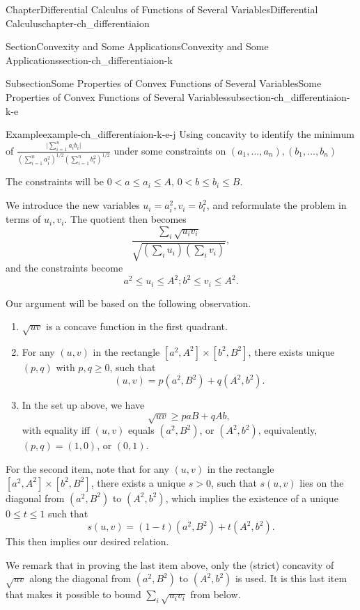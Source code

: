 \documentclass[oneside,10pt,]{book}
\numberwithin{equation}{section}
\newcommand{\lt}{<}
\begin{document}
\begin{chapterptx}{Chapter}{Differential Calculus of Functions of Several Variables}{}{Differential Calculus}{}{}{chapter-ch_differentiaion}
\begin{sectionptx}{Section}{Convexity and Some Applications}{}{Convexity and Some Applications}{}{}{section-ch_differentiaion-k}
\begin{subsectionptx}{Subsection}{Some Properties of Convex Functions of Several Variables}{}{Some Properties of Convex Functions of Several Variables}{}{}{subsection-ch_differentiaion-k-e}
\begin{example}{Example}{}{example-ch_differentiaion-k-e-j}
Using concavity to identify the minimum of \(\frac{ \Big| \sum_{i=1}^{n}a_{i}b_{i}\Big|}{\left(\sum_{i=1}^{n}a_{i}^{2}\right)^{1/2}
\left(\sum_{i=1}^{n}b_{i}^{2}\right)^{1/2}}\) under some constraints on \((a_{1},\ldots, a_{n}), (b_{1},\ldots, b_{n})\)%
\par
The constraints will be \(0\lt a\le a_{i}\le A\), \(0 \lt b\le b_{i}\le B\).%
\par
We introduce the new variables \(u_{i}=a_{i}^{2}, v_{i}=b_{i}^{2}\), and reformulate the problem in terms of \(u_{i}, v_{i}\). The quotient then becomes%
\begin{equation*}
\frac{\sum_{i} \sqrt{u_{i} v_{i}}}{\sqrt{(\sum_{i} u_{i}) (\sum_{i} v_{i})}},
\end{equation*}
and the constraints become%
\begin{equation*}
a^{2} \le u_{i}\le A^{2}; b^{2}\le v_{i}\le A^{2}.
\end{equation*}
%
\par
Our argument will be based on the following observation. %
\begin{enumerate}
\item{}\(\sqrt{uv}\) is a concave function in the first quadrant.%
\item{}For any \((u, v)\) in the rectangle \([a^2, A^2]\times[b^2, B^2]\), there exists unique \((p, q)\) with \(p, q \ge 0\), such that%
\begin{equation*}
(u, v)=p (a^2, B^2) + q(A^2, b^2).
\end{equation*}
%
\item{}In the set up above, we have%
\begin{equation*}
\sqrt{uv}\ge p aB+ q Ab,
\end{equation*}
with equality iff \((u, v)\) equals \((a^2, B^2)\), or \((A^2, b^2)\), equivalently, \((p, q)=(1, 0)\), or \((0, 1)\).%
\end{enumerate}
%
\par
For the second item, note that for any \((u, v)\) in the rectangle \([a^2, A^2]\times[b^2, B^2]\), there exists a unique \(s>0\), such that \(s (u, v)\) lies on the diagonal  from \((a^2, B^2)\) to \((A^2, b^2)\), which implies the existence of a unique \(0\le t \le 1\) such that%
\begin{equation*}
s (u, v)= (1-t) (a^2, B^2) + t(A^2, b^2).
\end{equation*}
This then implies our desired relation.%
\par
We remark that in proving the last item above, only the (strict) concavity of \(\sqrt{uv}\) along the diagonal from \((a^2, B^2)\) to \((A^2, b^2)\) is used. It is this last item that makes it possible to bound \(\sum_{i} \sqrt{u_{i} v_{i}}\) from below.%

\end{example}
\end{subsectionptx}
\end{sectionptx}
\end{chapterptx}
\end{document}
